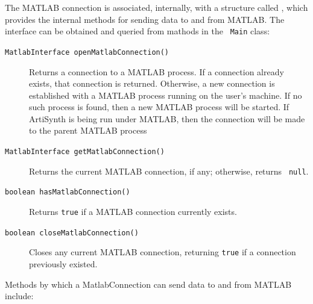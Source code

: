 \documentclass{article}
\begin{document}
The MATLAB connection is associated, internally, with a structure
called , which
provides the internal methods for sending data to and from MATLAB.
The interface can be obtained and queried from mathods in the {\tt
Main} class:

\begin{description}

\item[{\tt MatlabInterface openMatlabConnection()} ] \mbox{}

Returns a connection to a MATLAB process. If a connection already
exists, that connection is returned. Otherwise, a new connection is
established with a MATLAB process running on the user's machine.  If
no such process is found, then a new MATLAB process will be
started. If ArtiSynth is being run under MATLAB, then the connection
will be made to the parent MATLAB process

\item[{\tt MatlabInterface getMatlabConnection()} ] \mbox{}

Returns the current MATLAB connection, if any; otherwise, returns {\tt
null}.

\item[{\tt boolean hasMatlabConnection()} ] \mbox{}

Returns {\tt true} if a MATLAB connection currently exists.

\item[{\tt boolean closeMatlabConnection()} ] \mbox{}

Closes any current MATLAB connection, returning {\tt true} if a
connection previously existed.

\end{description}

Methods by which a MatlabConnection can send data to and from MATLAB
include:
\end{document}

